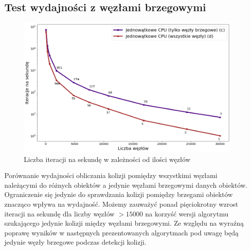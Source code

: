 \documentclass[12pt, letterpaper]{report}
\begin{document}
    \clearpage
    \subsection{Test wydajności z węzłami brzegowymi}
    \begin{figure}[H]
        \centering
        \includegraphics[width=16cm]{performance_cpu_boundary_noboundary.png}
        \caption{
            Liczba iteracji na sekundę w zależności od ilości węzłów
        }
    \end{figure}
    Porównanie wydajności obliczania kolizji pomiędzy wszystkimi węzłami należącymi do różnych obiektów
    a jedynie węzłami brzegowymi danych obiektów. Ograniczenie się jedynie do sprawdzania kolizji pomiędzy
    brzegami obiektów znacząco wpływa na wydajność. Możemy zauważyć ponad pięciokrotny wzrost iteracji
    na sekundę dla liczby węzłów $>15000$ na korzyść wersji algorytmu szukającego jedynie kolizji między 
    węzłami brzegowymi. Ze względu na wyraźną poprawę wyników w następnych prezentowanych algorytmach
    pod uwagę będą jedynie węzły brzegowe podczas detekcji kolizji.

\end{document}
